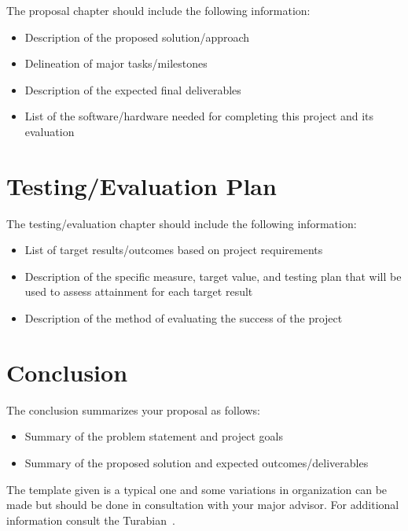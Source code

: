 \documentclass[ms,twoside,print]{nuthesis}
\theoremstyle{definition}
\begin{document}
The proposal chapter should include the following information:
\begin{itemize}
  \item Description of the proposed solution/approach
  \item Delineation of major tasks/milestones
  \item Description of the expected final deliverables
  \item List of the software/hardware needed for completing this project and its evaluation 
\end{itemize}

\chapter{Testing/Evaluation Plan}
The testing/evaluation chapter should include the following information:
\begin{itemize}
  \item List of target results/outcomes based on project requirements
  \item Description of the specific measure, target value, and testing plan that will be used to assess attainment for each target result
  \item Description of the method of evaluating the success of the project
\end{itemize}

\chapter{Conclusion}
The conclusion summarizes your proposal as follows:

\begin{itemize}
  \item Summary of the problem statement and project goals
  \item Summary of the proposed solution and expected outcomes/deliverables
\end{itemize}

The template given is a typical one and some variations in organization can be made but should be done in
consultation with your major advisor. For additional information consult the Turabian~\cite{turabian}. 


\backmatter

\appendix
\end{document}
